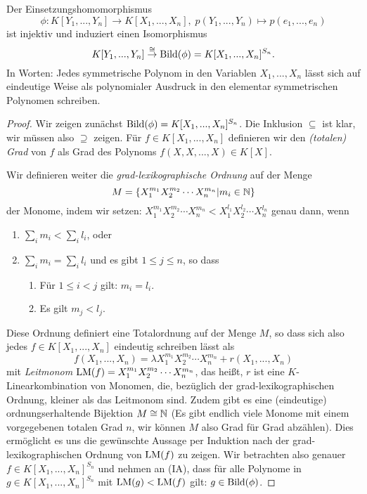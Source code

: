 \documentclass{book}
\begin{document}
\begin{thm}
    \label{thm:elsym}
    Der Einsetzungshomomorphismus 
    \[
        \phi: K[Y_1, ..., Y_n] \to K[X_1, ..., X_n],\; p(Y_1, ..., Y_n) \mapsto p(e_1, ..., e_n)
    \]
    ist injektiv und induziert einen Isomorphismus
    \[
        K[Y_1, ..., Y_n] \overset{\cong}{\to} \Bild(\phi) = K[X_1, ..., X_n]^{S_n}.
    \]
    In Worten: Jedes symmetrische Polynom in den Variablen $X_1, ..., X_n$
    lässt sich auf eindeutige Weise als polynomialer Ausdruck in den elementar
    symmetrischen Polynomen schreiben. 
\end{thm}
\begin{proof}
    Wir zeigen zunächst $\Bild(\phi) = K[X_1, ..., X_n]^{S_n}$. Die Inklusion $\subseteq$ ist klar, wir müssen also $\supseteq$ zeigen.
    Für $f \in K[X_1, ..., X_n]$ definieren wir den \emph{(totalen) Grad} von $f$ als Grad des
    Polynoms $f(X,X,...,X) \in K[X]$.

    Wir definieren weiter die \emph{grad-lexikographische Ordnung} auf der Menge 
    \[
        M = \{ X_1^{m_1}X_2^{m_2} \cdots X_n^{m_n} | m_i \in \mathbb{N} \}
    \]
    der Monome, indem wir setzen: $X_1^{m_1}X_2^{m_2} \cdots X_n^{m_n} < X_1^{l_1}X_2^{l_2} \cdots X_n^{l_n}$ genau dann, wenn 
    \begin{enumerate}[label=(\alph*)]
        \item $\sum_i m_i < \sum_i l_i$, oder
        \item $\sum_i m_i = \sum_i l_i$ und es gibt $1 \le j \le n$, so dass
    \begin{enumerate}
        \item Für $1 \le i < j$ gilt: $m_i = l_i$.
        \item Es gilt $m_j < l_j$. 
    \end{enumerate}
    \end{enumerate}
    Diese Ordnung definiert eine Totalordnung auf der Menge $M$, so dass sich
    also jedes $f \in K[X_1, ..., X_n]$ eindeutig schreiben lässt als
    \[
        f(X_1, ..., X_n) = \lambda X_1^{m_1}X_2^{m_2} \cdots X_n^{m_n} + r(X_1, ..., X_n)
    \]
    mit \emph{Leitmonom} $\operatorname{LM}(f) = X_1^{m_1}X_2^{m_2} \cdots X_n^{m_n}$, das heißt, $r$
    ist eine $K$-Linearkombination von Monomen, die, bezüglich der
    grad-lexikographischen Ordnung, kleiner als das Leitmonom  sind. Zudem gibt
    es eine (eindeutige) ordnungserhaltende Bijektion $M \cong \mathbb{N}$ (Es gibt
    endlich viele Monome mit einem vorgegebenen totalen Grad $n$, wir können
    $M$ also Grad für Grad abzählen). Dies ermöglicht es uns die gewünschte
    Aussage per Induktion nach der grad-lexikographischen Ordnung von $\operatorname{LM}(f)$
    zu zeigen. Wir betrachten also genauer $f \in K[X_1, ..., X_n]^{S_n}$ und
    nehmen an (IA), dass für alle Polynome in $g \in K[X_1, ..., X_n]^{S_n}$
    mit $\operatorname{LM}(g) < \operatorname{LM}(f)$ gilt: $g \in \Bild(\phi)$. 


\end{proof}
\end{document}
